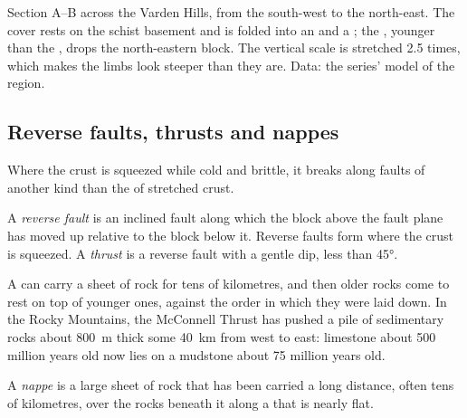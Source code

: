 \begin{omfigure}
{\small Section A--B across the Varden Hills, from the south-west to the
north-east. The cover rests on the schist basement and is folded into an
 and a ; the , younger than the , drops
the north-eastern block. The vertical scale is stretched 2.5 times, which
makes the limbs look steeper than they are. Data: the series' model of the
region.}
\end{omfigure}

\subsection{Reverse faults, thrusts and nappes}

Where the crust is squeezed while cold and brittle, it breaks along faults
of another kind than the  of stretched crust.

\begin{definition}\label{def:g12:mountain-building:thrust}
A \emph{reverse fault} is an inclined fault along which
the block above the fault plane has moved up relative to the block below
it. Reverse faults form where the crust is squeezed. A
\emph{thrust} is a reverse fault with a gentle dip, less than
\ang{45}.
\end{definition}

A  can carry a sheet of rock for tens of kilometres, and then older
rocks come to rest on top of younger ones, against the order in which they
were laid down. In the Rocky Mountains, the McConnell Thrust has pushed a
pile of sedimentary rocks about \qty{800}{m} thick some \qty{40}{km} from
west to east: limestone about 500 million years old now lies on a mudstone
about 75 million years old.

\begin{definition}[Nappe]\label{def:g12:mountain-building:nappe}
A \emph{nappe} is a large sheet of rock that has been carried a
long distance, often tens of kilometres, over the rocks beneath it along a
 that is nearly flat.
\end{definition}

